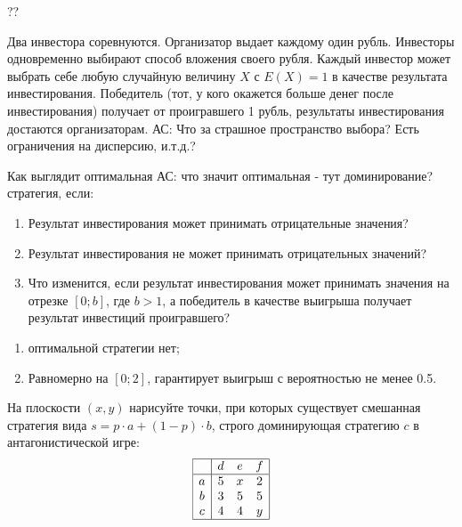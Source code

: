 \begin{problem}[Инвесторы.]
\begin{source}
\cite{ferguson:tn}??
\end{source}
Два инвестора соревнуются. Организатор выдает каждому один рубль. Инвесторы одновременно выбирают способ вложения своего рубля. Каждый инвестор может выбрать себе любую случайную величину $X$ с $E(X)=1$ в качестве результата инвестирования. Победитель (тот, у кого окажется больше денег после инвестирования) получает от проигравшего 1 рубль, результаты инвестирования достаются организаторам. {\red АС: Что за страшное пространство выбора? Есть ограничения на дисперсию, и.т.д.?}

Как выглядит оптимальная {\red АС: что значит оптимальная - тут доминирование?} стратегия, если:

\begin{enumerate}
\item Результат инвестирования может принимать отрицательные значения?

\item Результат инвестирования не может принимать отрицательных значений?

\item Что изменится, если результат инвестирования может принимать значения на отрезке $[0;b]$, где $b>1$, а победитель в качестве выигрыша получает результат инвестиций проигравшего?
\end{enumerate}





\begin{sol}
\begin{enumerate}
\item оптимальной стратегии нет;
\item Равномерно на $[0;2]$, гарантирует выигрыш с вероятностью не менее 0.5.
\end{enumerate}
\end{sol}
\end{problem}


\begin{problem}[Гипербола.]
На плоскости  $\left(x,y\right)$  нарисуйте точки, при которых существует смешанная стратегия вида  $s=p\cdot a+\left(1-p\right)\cdot b$, строго доминирующая стратегию  $c$  в антагонистической игре:
\[\begin{array}{|c|ccc|}  \hline {} & {d} & {e} & {f} \\  \hline {a} & {5} & {x} & {2} \\ {b} & {3} & {5} & {5} \\ {c} & {4} & {4} & {y} \\  \hline  \end{array}\]




\begin{sol}

\end{sol}
\end{problem}


